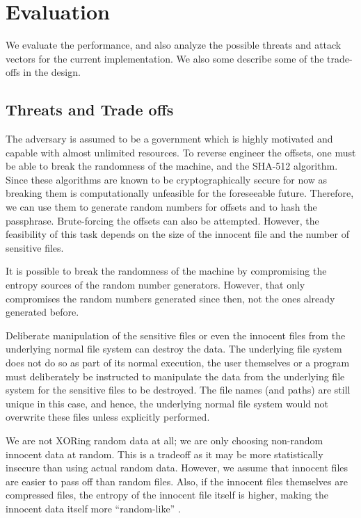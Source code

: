 \documentclass[10pt,twocolumn]{article}
\begin{document}
\section{Evaluation}

We evaluate the performance, and also analyze the possible threats and attack vectors for the current implementation. We also some describe some of the trade-offs in the design. 

\subsection{Threats and Trade offs}

The adversary is assumed to be a government which is highly motivated and capable with almost unlimited resources. To reverse engineer the offsets, one must be able to break the randomness of the machine, and the SHA-512 algorithm. Since these algorithms are known to be cryptographically secure for now as breaking them is computationally unfeasible for the foreseeable future. Therefore, we can use them to generate random numbers for offsets and to hash the passphrase. Brute-forcing the offsets can also be attempted. However, the feasibility of this task depends on the size of the innocent file and the number of sensitive files. 

It is possible to break the randomness of the machine by compromising the entropy sources of the random number generators. However, that only compromises the random numbers generated since then, not the ones already generated before. 

Deliberate manipulation of the sensitive files or even the innocent files from the underlying normal file system can destroy the data. The underlying file system does not do so as part of its normal execution, the user themselves or a program must deliberately be instructed to manipulate the data from the underlying file system for the sensitive files to be destroyed. The file names (and paths) are still unique in this case, and hence, the underlying normal file system would not overwrite these files unless explicitly performed. 

We are not XORing random data at all; we are only choosing non-random innocent data at random. This is a tradeoff as it may be more statistically insecure than using actual random data. However, we assume that innocent files are easier to pass off than random files. Also, if the innocent files themselves are compressed files, the entropy of the innocent file itself is higher, making the innocent data itself more ``random-like'' \cite{compression}. 
\end{document}
